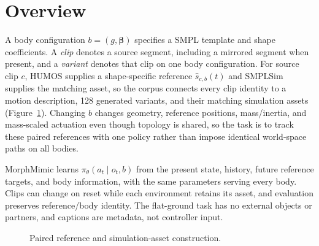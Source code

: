 \section{Overview}\label{sec:dataset}

A body configuration $b=(g,\boldsymbol{\beta})$ specifies a SMPL template
and shape coefficients. A \emph{clip} denotes a source segment, including a
mirrored segment when present, and a \emph{variant} denotes that clip on one
body configuration. For source clip $c$, HUMOS supplies a shape-specific
reference $\hat{s}_{c,b}(t)$ and SMPLSim supplies the matching asset, so the
corpus connects every clip identity to a motion description, 128 generated
variants, and their matching simulation assets
(Figure~\ref{fig:data_pipeline}). Changing $b$ changes geometry, reference
positions, mass/inertia, and mass-scaled actuation even though topology is
shared, so the task is to track these paired references with one policy rather
than impose identical world-space paths on all bodies.

MorphMimic learns $\pi_\theta(a_t\mid o_t,b)$ from the present state, history,
future reference targets, and body information, with the same parameters
serving every body. Clips can change on reset while each environment retains
its asset, and evaluation preserves reference/body identity. The flat-ground
task has no external objects or partners, and captions are metadata, not
controller input.

\begin{figure}[t]
\centering
{}
\caption{Paired reference and simulation-asset construction.}\label{fig:data_pipeline}
\end{figure}

